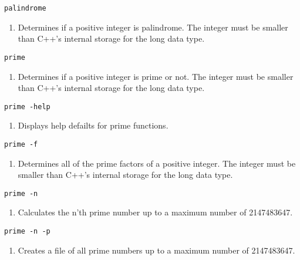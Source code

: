 \begin{lstlisting} 
palindrome   
\end{lstlisting}
\begin{enumerate}
	\item[] Determines if a positive integer is palindrome. The integer must be smaller than C++'s internal storage for the long data type.
\end{enumerate}

\begin{lstlisting} 
prime   
\end{lstlisting}
\begin{enumerate}
	\item[] Determines if a positive integer is prime or not. The integer must be smaller than C++'s internal storage for the long data type.
\end{enumerate}

\begin{lstlisting} 
prime -help
\end{lstlisting}
\begin{enumerate}
	\item[]  Displays help defailts for prime functions.
\end{enumerate}

\begin{lstlisting} 
prime -f   
\end{lstlisting}
\begin{enumerate}
	\item[] Determines all of the prime factors of a positive integer. The integer must be smaller than C++'s internal storage for the long data type.
\end{enumerate}

\begin{lstlisting} 
prime -n  
\end{lstlisting}
\begin{enumerate}
	\item[] Calculates the n'th prime number up to a maximum number of 2147483647.
\end{enumerate}

\begin{lstlisting} 
prime -n -p   
\end{lstlisting}
\begin{enumerate}
	\item[] Creates a file of all prime numbers up to a maximum number of 2147483647.
\end{enumerate}

